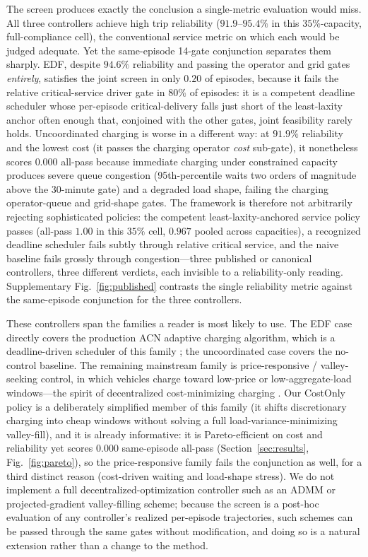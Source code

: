 \documentclass[12pt]{article}
\newcommand{\figref}[1]{Fig.~\ref{#1}}
\begin{document}
The screen produces exactly the conclusion a single-metric evaluation would miss. All three controllers achieve high trip reliability ($91.9$--$95.4\%$ in this $35\%$-capacity, full-compliance cell), the conventional service metric on which each would be judged adequate. Yet the same-episode 14-gate conjunction separates them sharply. EDF, despite $94.6\%$ reliability and passing the operator and grid gates \emph{entirely}, satisfies the joint screen in only $0.20$ of episodes, because it fails the relative critical-service driver gate in $80\%$ of episodes: it is a competent deadline scheduler whose per-episode critical-delivery falls just short of the least-laxity anchor often enough that, conjoined with the other gates, joint feasibility rarely holds. Uncoordinated charging is worse in a different way: at $91.9\%$ reliability and the lowest cost (it passes the charging operator \emph{cost} sub-gate), it nonetheless scores $0.000$ all-pass because immediate charging under constrained capacity produces severe queue congestion (95th-percentile waits two orders of magnitude above the $30$-minute gate) and a degraded load shape, failing the charging operator-queue and grid-shape gates. The framework is therefore not arbitrarily rejecting sophisticated policies: the competent least-laxity-anchored service policy passes (all-pass $1.00$ in this $35\%$ cell, $0.967$ pooled across capacities), a recognized deadline scheduler fails subtly through relative critical service, and the naive baseline fails grossly through congestion---three published or canonical controllers, three different verdicts, each invisible to a reliability-only reading. Supplementary Fig.~\ref{fig:published} contrasts the single reliability metric against the same-episode conjunction for the three controllers.

These controllers span the families a reader is most likely to use. The EDF case directly covers the production ACN adaptive charging algorithm, which is a deadline-driven scheduler of this family \cite{lee2021adaptive}; the uncoordinated case covers the no-control baseline. The remaining mainstream family is price-responsive / valley-seeking control, in which vehicles charge toward low-price or low-aggregate-load windows---the spirit of decentralized cost-minimizing charging \cite{ma2013}. Our CostOnly policy is a deliberately simplified member of this family (it shifts discretionary charging into cheap windows without solving a full load-variance-minimizing valley-fill), and it is already informative: it is Pareto-efficient on cost and reliability yet scores $0.000$ same-episode all-pass (Section~\ref{sec:results}, \figref{fig:pareto}), so the price-responsive family fails the conjunction as well, for a third distinct reason (cost-driven waiting and load-shape stress). We do not implement a full decentralized-optimization controller such as an ADMM or projected-gradient valley-filling scheme; because the screen is a post-hoc evaluation of any controller's realized per-episode trajectories, such schemes can be passed through the same gates without modification, and doing so is a natural extension rather than a change to the method.
\end{document}
